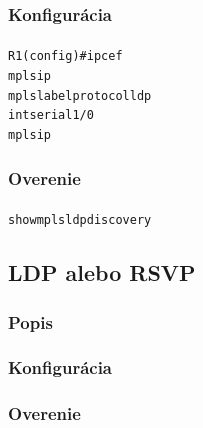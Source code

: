 \documentclass[12pt,twoside,a4paper]{report}
\begin{document}
\subsubsection{Konfigurácia}
\paragraph{}

\noindent
{\selectfont
\begin{small}
\begin{alltt}
R1 (config)#ip cef
mpls ip
mpls label protocol ldp
int serial1/0
  mpls ip
\end{alltt}
\end{small}
}

\subsubsection{Overenie}
\paragraph{}
\noindent
{\selectfont
\begin{small}
\begin{alltt}
show mpls ldp discovery
\end{alltt}
\end{small}
}






\subsection{LDP alebo RSVP}
\subsubsection{Popis}
\paragraph{}

\subsubsection{Konfigurácia}
\paragraph{}

\subsubsection{Overenie}
\end{document}
